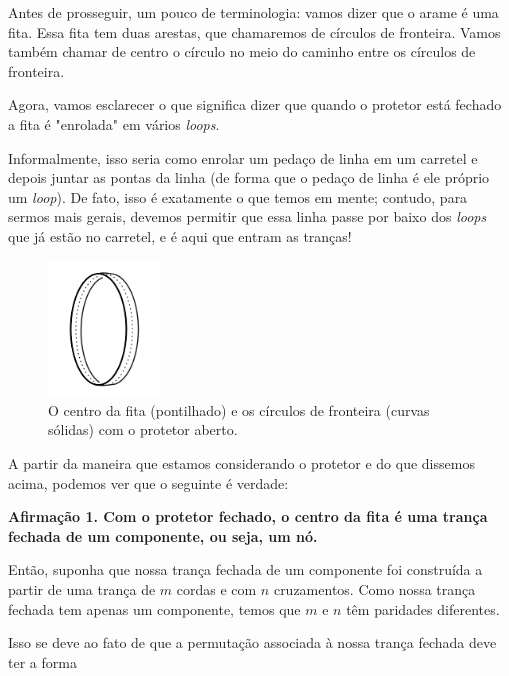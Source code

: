 \documentclass[a4paper,portuguese,11pt,twoside, leqno]{book}
\theoremstyle{definition}
\begin{document}
	\par\vspace{0.3cm} Antes de prosseguir, um pouco de terminologia: vamos dizer que o arame é uma fita. Essa fita tem duas arestas, que chamaremos de círculos de fronteira. Vamos também chamar de centro o círculo no meio do caminho entre os círculos de fronteira. 
	\par\vspace{0.3cm} Agora, vamos esclarecer o que significa dizer que quando o protetor está fechado a fita é "enrolada" em vários \textit{loops}.
	\par\vspace{0.3cm} Informalmente, isso seria como enrolar um pedaço de linha em um carretel e depois juntar as pontas da linha (de forma que o pedaço de linha é ele próprio um \textit{loop}). De fato, isso é exatamente o que temos em mente; contudo, para sermos mais gerais, devemos permitir que essa linha passe por baixo dos \textit{loops} que já estão no carretel, e é aqui que entram as tranças! 
	\begin{figure}[H]
		\begin{center}
			\includegraphics[width=3cm]{fita.png}
		\end{center}\caption{O centro da fita (pontilhado) e os círculos de fronteira (curvas sólidas) com o protetor aberto.}
	\end{figure}
	\par\vspace{0.3cm} A partir da maneira que estamos considerando o protetor e do que dissemos acima, podemos ver que o seguinte é verdade:
	\begin{center}
		\textbf{Afirmação 1. Com o protetor fechado, o centro da fita é uma trança fechada de um componente, ou seja, um nó.}
	\end{center}
	\par\vspace{0.3cm} Então, suponha que nossa trança fechada de um componente foi construída a partir de uma trança de $m$ cordas e com $n$ cruzamentos. Como nossa trança fechada tem apenas um componente, temos que $m$ e $n$ têm paridades diferentes.
	\par\vspace{0.3cm} Isso se deve ao fato de que a permutação associada à nossa trança fechada deve ter a forma
\end{document}
